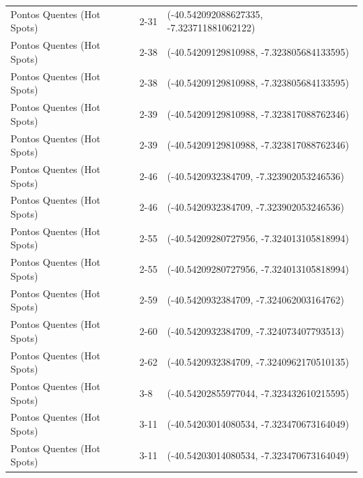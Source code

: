 \documentclass[dvipsnames]{article}%
\begin{document}
\begin{table}[h!]
\begin{tabular}{lll}
Pontos Quentes (Hot Spots)&2{-}31&({-}40.542092088627335, {-}7.323711881062122)\\%
Pontos Quentes (Hot Spots)&2{-}38&({-}40.54209129810988, {-}7.323805684133595)\\%
Pontos Quentes (Hot Spots)&2{-}38&({-}40.54209129810988, {-}7.323805684133595)\\%
Pontos Quentes (Hot Spots)&2{-}39&({-}40.54209129810988, {-}7.323817088762346)\\%
Pontos Quentes (Hot Spots)&2{-}39&({-}40.54209129810988, {-}7.323817088762346)\\%
Pontos Quentes (Hot Spots)&2{-}46&({-}40.5420932384709, {-}7.323902053246536)\\%
Pontos Quentes (Hot Spots)&2{-}46&({-}40.5420932384709, {-}7.323902053246536)\\%
Pontos Quentes (Hot Spots)&2{-}55&({-}40.54209280727956, {-}7.324013105818994)\\%
Pontos Quentes (Hot Spots)&2{-}55&({-}40.54209280727956, {-}7.324013105818994)\\%
Pontos Quentes (Hot Spots)&2{-}59&({-}40.5420932384709, {-}7.324062003164762)\\%
Pontos Quentes (Hot Spots)&2{-}60&({-}40.5420932384709, {-}7.324073407793513)\\%
Pontos Quentes (Hot Spots)&2{-}62&({-}40.5420932384709, {-}7.3240962170510135)\\%
Pontos Quentes (Hot Spots)&3{-}8&({-}40.54202855977044, {-}7.323432610215595)\\%
Pontos Quentes (Hot Spots)&3{-}11&({-}40.54203014080534, {-}7.323470673164049)\\%
Pontos Quentes (Hot Spots)&3{-}11&({-}40.54203014080534, {-}7.323470673164049)\\%
\bottomrule%
\end{tabular}%
\end{table}

%
\FloatBarrier%
\end{document}
